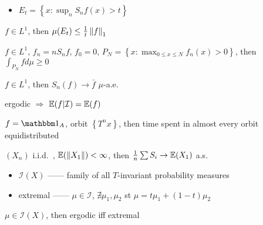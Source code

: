 \begin{itemize}
    \item $E_t = \left\{ x : \sup_n S_{n}f(x) > t \right\}$
\end{itemize}

\begin{thm}
    $f \in L^1$, then $\mu(E_t) \leq \frac{1}{t}\left\lVert f\right\rVert_1$
\end{thm}

\begin{lemma}
    $f \in L^1$, $f_n = nS_{n}f$, $f_0 = 0$, $P_N = \left\{ x : \max_{0 \leq x \leq N} f_n(x) > 0 \right\}$, then $\int_{P_{N}} fd\mu \geq 0$
\end{lemma}

\begin{thm}
    $f \in L^1$, then $S_n(f) \rightarrow \bar{f}$ $\mu$-a.e.\
\end{thm}

\begin{fact}
    ergodic $\Rightarrow$ $\mathbb{E}(f|\mathcal{I}) = \mathbb{E}(f)$
\end{fact}

\begin{fact}
    $f = \In_A$, orbit $\left\{ T^{n}x \right\}$, then time spent in almost every orbit equidistributed
\end{fact}

\begin{cor}
    $(X_n)$ i.i.d.\ , $\mathbb{E}(\left\lVert X_1\right\rVert) < \infty$, then $\frac{1}{n}\sum S_i \rightarrow \mathbb{E}(X_1)$ a.s.\
\end{cor}

\begin{itemize}
    \item $\mathcal{I}(X)$ ------ family of all $T$-invariant probability measures
    \item extremal ------ $\mu \in \mathcal{I}$, $\nexists \mu_1, \mu_2$ st $\mu = t\mu_1 + (1 - t)\mu_2$
\end{itemize}

\begin{prop}
    $\mu \in \mathcal{I}(X)$, then ergodic iff extremal
\end{prop}
